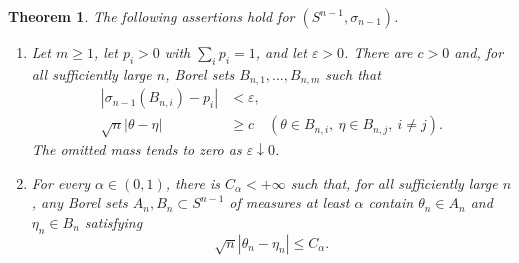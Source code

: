 \documentclass{amsart}
\numberwithin{equation}{section}
\theoremstyle{plain}
\newtheorem{theorem}{Theorem}[section]
\theoremstyle{definition}
\theoremstyle{remark}
\newcommand{\eps}{\varepsilon}
\begin{document}
\begin{theorem}\label{thm:spherical-blocks-nearby}
The following assertions hold for $(S^{n-1},\sigma_{n-1})$.
\begin{enumerate}[label=\textup{(\alph*)}]
\item Let $m\ge1$, let $p_i>0$ with $\sum_i p_i=1$, and let $\eps>0$.  There are $c>0$ and, for all sufficiently large $n$, Borel sets $B_{n,1},\ldots,B_{n,m}$ such that
\begin{align}
|\sigma_{n-1}(B_{n,i})-p_i|&<\eps, \label{eq:spherical-block-masses}\\
 \sqrt n|\theta-\eta|&\ge c
 \quad(\theta\in B_{n,i},\ \eta\in B_{n,j},\ i\ne j).
 \label{eq:spherical-block-separation}
\end{align}
The omitted mass tends to zero as $\eps\downarrow0$.
\item For every $\alpha\in(0,1)$, there is $C_\alpha<+\infty$ such that, for all sufficiently large $n$, any Borel sets $A_n,B_n\subset S^{n-1}$ of measures at least $\alpha$ contain $\theta_n\in A_n$ and $\eta_n\in B_n$ satisfying
\begin{equation}\label{eq:spherical-nearby-points} \sqrt n|\theta_n-\eta_n|\le C_\alpha. \end{equation}
\end{enumerate}
\end{theorem}
\end{document}
